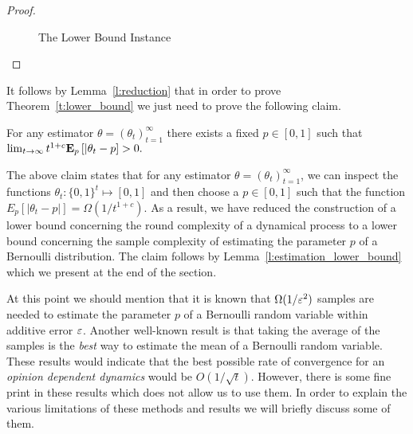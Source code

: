 \begin{proof}
\begin{figure}
    \centering
    \vspace{-10mm}
    \caption{The Lower Bound Instance} \label{fig:lb_instance}
  \end{figure}
\end{proof}
%
It follows by Lemma~\ref{l:reduction} that in order to prove Theorem~\ref{t:lower_bound} we
just need to prove the following claim.
\begin{claim}\label{cl:fixed_p}
  For any estimator $\theta = (\theta_t)_{t=1}^\infty$
  there exists a fixed $p \in [0,1]$ such that
  \(
    \lim_{t \to \infty} t^{1+c} \bm{\mathrm{E}}_{p} \left[ |\theta_t - p \right] > 0.
  \)
\end{claim}
The above claim states that for any estimator $\theta=(\theta_t)_{t=1}^\infty$,
we can inspect the functions $\theta_t: \{0,1\}^t \mapsto [0,1]$ and then choose
a $p \in [0,1]$ such that the function $E_p[|\theta_t-p|]= \Omega(1/t^{1+c})$. As
a result, we have reduced the construction of a lower bound concerning the round
complexity of a dynamical process to a lower bound concerning the sample complexity of
estimating the parameter $p$ of a Bernoulli distribution. The claim follows by
Lemma~\ref{l:estimation_lower_bound} which we present at the end of the section.

At this point we should mention that it is known
that $\Omega(1/\varepsilon^2)$ samples are needed to estimate the parameter $p$
of a Bernoulli random variable within additive error $\varepsilon$.
Another well-known result is that taking the average of the samples
is the \emph{best} way to estimate the mean of a Bernoulli random variable.
These results would indicate that the best possible rate of convergence
for an \emph{opinion dependent dynamics} would be $O(1/\sqrt{t})$.
However, there is some fine print in these results which does not allow us
to use them. In order to explain the various limitations of
these methods and results we will briefly discuss some of them.

